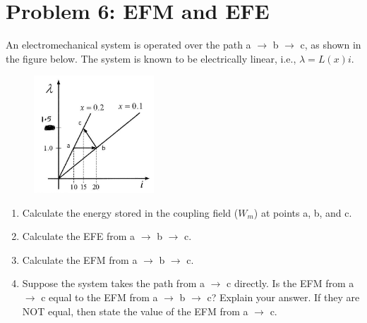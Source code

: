 \documentclass{article}
\begin{document}
\newpage %
\noindent 
\section*{Problem 6: EFM and EFE}  
An electromechanical system is operated over the path a $\rightarrow$ b $\rightarrow$ c, as shown in the figure below.  The system is known to be electrically linear, i.e., $\lambda=L(x)i$.

\begin{figure}[H]
        \centering
        \includegraphics[width=0.4\textwidth]{figures/q6.PNG}
        \label{poletradsaj}
\end{figure}
\begin{enumerate}[label=(\alph*)]
    \item {Calculate the energy stored in the coupling field ($W_m$) at points a, b, and c.}
    \item {Calculate the EFE from a $\rightarrow$ b $\rightarrow$ c.}
    \item {Calculate the EFM from a $\rightarrow$ b $\rightarrow$ c.}
    \item{Suppose the system takes the path from a $\rightarrow$ c directly. Is the EFM from a $\rightarrow$ c equal to the EFM from a $\rightarrow$ b $\rightarrow$ c? Explain your answer. If they are NOT equal, then state the value of the EFM from a $\rightarrow$ c.}
\end{enumerate}
\newpage %
\noindent 
\end{document}
